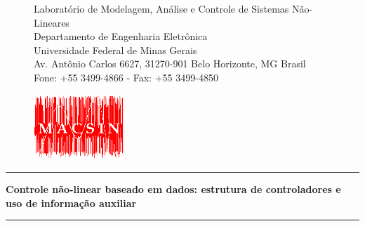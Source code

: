 
\begin{titlepage}

\begin{figure}[!ht]
\begin{minipage}[b]{0.7\linewidth}
\begin{tiny}
Laboratório de Modelagem, Análise e Controle de Sistemas Não-Lineares \\
Departamento de Engenharia Eletrônica\\
Universidade Federal de Minas Gerais\\
Av. Antônio Carlos 6627, 31270-901 Belo Horizonte, MG Brasil\\

Fone: +55 3499-4866 - Fax: +55 3499-4850 %
\end{tiny}
\end{minipage}\hfill
\begin{minipage}[c]{0.3\linewidth}
\begin{flushright}
\vspace{-1.2cm}
\includegraphics[scale=1.37]{mac.png}
\end{flushright}
\end{minipage}
\end{figure}

\vspace{1.75cm}
\begin{center}
\thickhrulefill
\par\nobreak
\vspace*{10pt}%
\hrule
\vspace*{10pt}%
{\bf \Huge \bfseries Controle não-linear baseado em dados: estrutura de controladores e uso de informação auxiliar}
\vspace*{10pt}%
\hrule
\vspace*{40pt}%


\end{center}
\end{titlepage}
